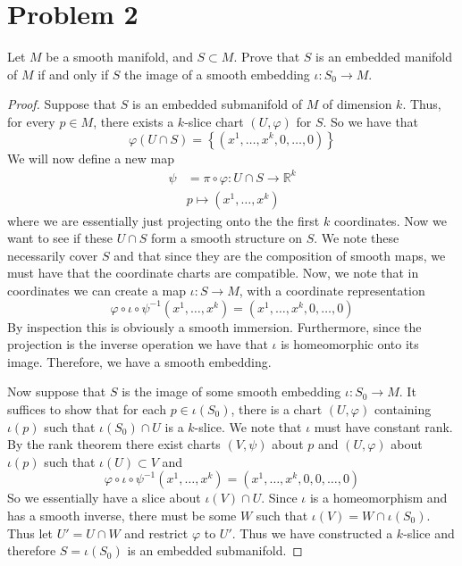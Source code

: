 \documentclass[a4paper]{article}
\begin{document}
\section*{Problem 2}%
Let $M$ be a smooth manifold, and $S \subset M$. Prove that $S$ is an embedded manifold of $M$ if and only if $S$ the image of a smooth embedding $\iota: S_0 \rightarrow M$.

\begin{proof}
  Suppose that $S$ is an embedded submanifold of $M$ of dimension $k$. Thus, for every $p \in M$, there exists a $k$-slice chart $(U,\varphi)$ for $S$. So we have that 
  \[
    \varphi(U \cap S) = \left\{ \left( x^1, \dots, x^k, 0, \dots, 0 \right) \right\}
  \]
  We will now define a new map
  \[
    \begin{aligned}
      \psi &= \pi \circ \varphi: U \cap S \rightarrow \mathds{R}^k \\
           &p \mapsto (x^1, \dots, x^k)
    \end{aligned}
  \]
  where we are essentially just projecting onto the the first $k$ coordinates. Now we want to see if these $U \cap S$ form a smooth structure on $S$. We note these necessarily cover $S$ and that since they are the composition of smooth maps, we must have that the coordinate charts are compatible. Now, we note that in coordinates we can create a map $\iota: S \rightarrow M$, with a coordinate representation 
  \[
    \varphi \circ \iota \circ \psi^{-1}(x^1, \dots, x^k) = (x^1, \dots, x^k, 0, \dots, 0)
  \]
  By inspection this is obviously a smooth immersion. Furthermore, since the projection is the inverse operation we have that $\iota$ is homeomorphic onto its image. Therefore, we have a smooth embedding.


  Now suppose that $S$ is the image of some smooth embedding $\iota: S_0 \rightarrow M$. It suffices to show that for each $p \in \iota(S_0)$, there is a chart $(U, \varphi)$ containing $\iota(p)$ such that $\iota(S_0) \cap U$ is a $k$-slice. We note that $\iota$ must have constant rank. By the rank theorem there exist charts $(V, \psi)$ about $p$ and $(U,\varphi)$ about $\iota(p)$ such that $\iota(U) \subset V$ and 
  \[
    \varphi \circ \iota \circ \psi^{-1}(x^1, \dots, x^k) = (x^1, \dots, x^k, 0, 0, \dots, 0)
  \]
  So we essentially have a slice about $\iota(V) \cap U$. Since $\iota$ is a homeomorphism and has a smooth inverse, there must be some $W$ such that $\iota(V) = W \cap \iota(S_0)$. Thus let $U' = U \cap W$ and restrict $\varphi$ to $U'$. Thus we have constructed a $k$-slice and therefore $S = \iota(S_0)$ is an embedded submanifold.
\end{proof}
\end{document}
